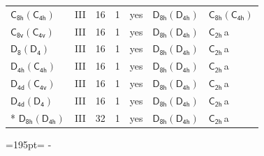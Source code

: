 \documentclass[10pt,a4paper]{article}
\newcommand{\needspace}[1]{\par\penalty-100\begingroup\dimen0=#1\relax\dimen2=\pagegoal
  \advance\dimen2-\pagetotal\ifdim\dimen0>\dimen2\relax\ifdim\dimen2>0pt\vfil\break\fi\fi
  \endgroup}
\numberwithin{equation}{section}
\newcommand{\grp}[1]{\mathsf{#1}}
\newcommand{\clsletter}[1]{\,{\scriptsize\color{black!55}#1}}
\begin{document}
{\begin{longtable}{@{}llrrlll@{}}
\href{C8h-C4h.pdf}{$\grp{C_{8h}}(\grp{C_{4h}})$} & III & 16 & 1 & yes & \href{D8h-D4h.pdf}{$\grp{D_{8h}}(\grp{D_{4h}})$} & \href{C8h-C4h.pdf}{$\grp{C_{8h}}(\grp{C_{4h}})$}\\
\href{C8v-C4v.pdf}{$\grp{C_{8v}}(\grp{C_{4v}})$} & III & 16 & 1 & yes & \href{D8h-D4h.pdf}{$\grp{D_{8h}}(\grp{D_{4h}})$} & \href{../../../rotation/data/pdf/C2h.pdf}{$\grp{C_{2h}}$}\clsletter{a}\\
\href{D8-D4.pdf}{$\grp{D_{8}}(\grp{D_{4}})$} & III & 16 & 1 & yes & \href{D8h-D4h.pdf}{$\grp{D_{8h}}(\grp{D_{4h}})$} & \href{../../../rotation/data/pdf/C2h.pdf}{$\grp{C_{2h}}$}\clsletter{a}\\
\href{D4h-C4h.pdf}{$\grp{D_{4h}}(\grp{C_{4h}})$} & III & 16 & 1 & yes & \href{D8h-D4h.pdf}{$\grp{D_{8h}}(\grp{D_{4h}})$} & \href{../../../rotation/data/pdf/C2h.pdf}{$\grp{C_{2h}}$}\clsletter{a}\\
\href{D4d-C4v.pdf}{$\grp{D_{4d}}(\grp{C_{4v}})$} & III & 16 & 1 & yes & \href{D8h-D4h.pdf}{$\grp{D_{8h}}(\grp{D_{4h}})$} & \href{../../../rotation/data/pdf/C2h.pdf}{$\grp{C_{2h}}$}\clsletter{a}\\
\href{D4d-D4.pdf}{$\grp{D_{4d}}(\grp{D_{4}})$} & III & 16 & 1 & yes & \href{D8h-D4h.pdf}{$\grp{D_{8h}}(\grp{D_{4h}})$} & \href{../../../rotation/data/pdf/C2h.pdf}{$\grp{C_{2h}}$}\clsletter{a}\\*
\href{D8h-D4h.pdf}{$\grp{D_{8h}}(\grp{D_{4h}})$} & III & 32 & 1 & yes & \href{D8h-D4h.pdf}{$\grp{D_{8h}}(\grp{D_{4h}})$} & \href{../../../rotation/data/pdf/C2h.pdf}{$\grp{C_{2h}}$}\clsletter{a}\\
\bottomrule\end{longtable}}
\needspace{195pt}
\end{document}
